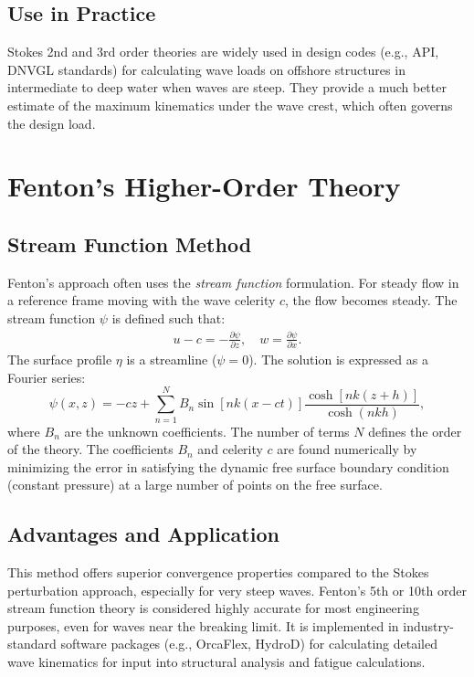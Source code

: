 \documentclass[11pt,letterpaper]{article}
\begin{document}
    \subsection{Use in Practice}
    Stokes 2nd and 3rd order theories are widely used in design codes (e.g., API, DNVGL standards) for calculating wave loads on offshore structures in intermediate to deep water when waves are steep. They provide a much better estimate of the maximum kinematics under the wave crest, which often governs the design load.

    \section{Fenton’s Higher-Order Theory}
    \subsection{Stream Function Method}
    Fenton's approach often uses the \emph{stream function} formulation. For steady flow in a reference frame moving with the wave celerity $c$, the flow becomes steady. The stream function $\psi$ is defined such that:
    \begin{align}
        u - c = -\frac{\partial \psi}{\partial z}, \quad w = \frac{\partial \psi}{\partial x}.
    \end{align}
    The surface profile $\eta$ is a streamline ($\psi = 0$). The solution is expressed as a Fourier series:
    \begin{equation}
        \psi(x,z) = -c z + \sum_{n=1}^{N} B_n \sin[nk(x - c t)] \frac{\cosh[nk(z+h)]}{\cosh(nkh)},
    \end{equation}
    where $B_n$ are the unknown coefficients. The number of terms $N$ defines the order of the theory. The coefficients $B_n$ and celerity $c$ are found numerically by minimizing the error in satisfying the dynamic free surface boundary condition (constant pressure) at a large number of points on the free surface.

    \subsection{Advantages and Application}
    This method offers superior convergence properties compared to the Stokes perturbation approach, especially for very steep waves. Fenton's 5th or 10th order stream function theory is considered highly accurate for most engineering purposes, even for waves near the breaking limit. It is implemented in industry-standard software packages (e.g., OrcaFlex, HydroD) for calculating detailed wave kinematics for input into structural analysis and fatigue calculations.
\end{document}
